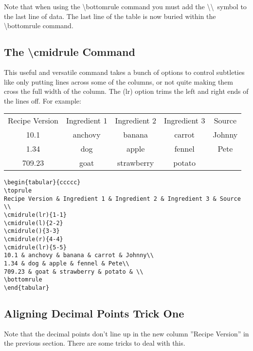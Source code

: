 Note that when using the {\textbackslash}bottomrule command you must add the \textbackslash\textbackslash ~symbol to the last line of data.  The last line of the table is now buried within the {\textbackslash}bottomrule command.

\pagebreak
\subsection{The {\textbackslash}cmidrule Command}
This useful and versatile command takes a bunch of options to control subtleties like only putting lines across some of the columns, or not quite making them cross the full width of the column. The (lr) option trims the left and right ends of the lines off. For example:

\begin{center}
\begin{tabular}{ccccc}
\toprule
Recipe Version & Ingredient 1 & Ingredient 2 & Ingredient 3 & Source \\
\cmidrule(lr){1-1}
\cmidrule(l){2-2}
\cmidrule(){3-3}
\cmidrule(r){4-4}
\cmidrule(lr){5-5}
10.1 & anchovy & banana & carrot & Johnny\\
1.34 & dog & apple & fennel & Pete\\
709.23 & goat & strawberry & potato & \\
\bottomrule
\end{tabular}

\vspace*{2ex}

\begin{verbatim}
\begin{tabular}{ccccc}
\toprule
Recipe Version & Ingredient 1 & Ingredient 2 & Ingredient 3 & Source \\
\cmidrule(lr){1-1}
\cmidrule(l){2-2}
\cmidrule(){3-3}
\cmidrule(r){4-4}
\cmidrule(lr){5-5}
10.1 & anchovy & banana & carrot & Johnny\\
1.34 & dog & apple & fennel & Pete\\
709.23 & goat & strawberry & potato & \\
\bottomrule
\end{tabular}
\end{verbatim}
\end{center}

\pagebreak
\subsection{Aligning Decimal Points Trick One}
Note that the decimal points don't line up in the new column ''Recipe Version'' in the previous section. There are some tricks to deal with this.

